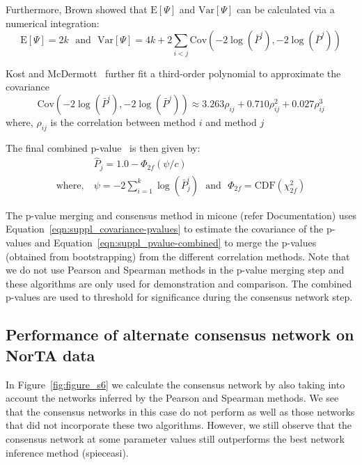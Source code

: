   Furthermore, Brown showed that $\mathrm{E}[\Psi]$ and $\mathrm{Var}[\Psi]$ can be calculated via a numerical integration:
  \begin{equation*}
    \mathrm{E}[\Psi] = 2k ~~~\text{and}~~~ \mathrm{Var}[\Psi] = 4k + 2\sum_{i<j} \mathrm{Cov}\left( -2\log(\bar{P}^i), -2\log(\bar{P}^j) \right)
  \end{equation*}

  Kost and McDermott~\cite{kost_combining_2002} further fit a third-order polynomial to approximate the covariance
  \begin{equation}
    \mathrm{Cov}\left( -2\log(\bar{P}^i), -2\log(\bar{P}^j) \right) \approx 3.263 \rho_{ij} + 0.710 \rho_{ij}^2 + 0.027 \rho_{ij}^3
    \label{eqn:suppl_covariance-pvalues}
  \end{equation}
  where, $\rho_{ij}$ is the correlation between method $i$ and method $j$

  The final combined p-value~\cite{Poole_Gibbs_Shmulevich_Bernard_Knijnenburg_2016} is then given by:
  \begin{equation}
    \begin{aligned}
        & \hat{P}_j = 1.0 - \Phi_{2f}\left( \psi / c \right) \\
        \text{where},~ &\psi = -2 \sum_{i=1}^k \log(\bar{P}^i_j) ~~~\text{and}~~~ \Phi_{2f} = \mathrm{CDF}\left( \chi^2_{2f} \right)
    \end{aligned}
    \label{eqn:suppl_pvalue-combined}
  \end{equation}

  The p-value merging and consensus method in \ac{micone} (refer Documentation) uses Equation~\ref{eqn:suppl_covariance-pvalues} to estimate the covariance of the p-values and Equation~\ref{eqn:suppl_pvalue-combined} to merge the p-values (obtained from bootstrapping) from the different correlation methods.
  Note that we do not use Pearson and Spearman methods in the p-value merging step and these algorithms are only used for demonstration and comparison.
  The combined p-values are used to threshold for significance during the consensus network step.

  \subsection*{Performance of alternate consensus network on NorTA data}

    In Figure~\ref{fig:figure_s6} we calculate the consensus network by also taking into account the networks inferred by the Pearson and Spearman methods.
    We see that the consensus networks in this case do not perform as well as those networks that did not incorporate these two algorithms.
    However, we still observe that the consensus network at some parameter values still outperforms the best network inference method (\ac{spieceasi}).

